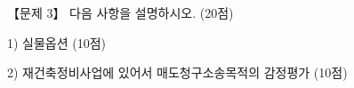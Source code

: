 \begin{longquestion}{【문제 3】}
다음 사항을 설명하시오. (20점) \par
1) 실물옵션 (10점) \par
2) 재건축정비사업에 있어서 매도청구소송목적의 감정평가 (10점) \par
\end{longquestion}
